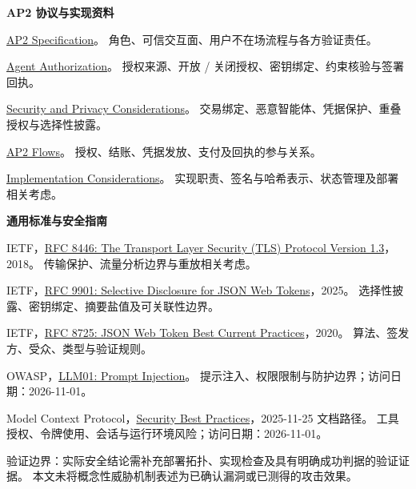 \documentclass[UTF8,fontset=fandol,a4paper,zihao=-4]{ctexart}
\newcommand{\Topic}[2]{\vspace{4pt}{\color{teal}\bfseries #1}\quad #2\par}
\newcommand{\Note}[1]{{\fontsize{9}{13.1}\selectfont\color{muted}#1\par}}
\newcommand{\Link}[2]{\href{#1}{#2}}
\begin{document}
\vspace{7pt}
{\bfseries\color{teal}AP2 协议与实现资料\par}
\begingroup\fontsize{10}{14.4}\selectfont
\Topic{[P1]}{\Link{https://github.com/iXanadu13/AP2/blob/019561ad8138d869da43d18e932f2edc155c48c9/docs/ap2/specification.md}{AP2 Specification}。
角色、可信交互面、用户不在场流程与各方验证责任。}
\Topic{[P2]}{\Link{https://github.com/iXanadu13/AP2/blob/019561ad8138d869da43d18e932f2edc155c48c9/docs/ap2/agent_authorization.md}{Agent Authorization}。
授权来源、开放 / 关闭授权、密钥绑定、约束核验与签署回执。}
\Topic{[P3]}{\Link{https://github.com/iXanadu13/AP2/blob/019561ad8138d869da43d18e932f2edc155c48c9/docs/ap2/security_and_privacy_considerations.md}{Security and Privacy Considerations}。
交易绑定、恶意智能体、凭据保护、重叠授权与选择性披露。}
\Topic{[P4]}{\Link{https://github.com/iXanadu13/AP2/blob/019561ad8138d869da43d18e932f2edc155c48c9/docs/ap2/flows.md}{AP2 Flows}。
授权、结账、凭据发放、支付及回执的参与关系。}
\Topic{[P5]}{\Link{https://github.com/iXanadu13/AP2/blob/019561ad8138d869da43d18e932f2edc155c48c9/docs/ap2/implementation_considerations.md}{Implementation Considerations}。
实现职责、签名与哈希表示、状态管理及部署相关考虑。}
\endgroup

\vspace{8pt}
{\bfseries\color{teal}通用标准与安全指南\par}
\begingroup\fontsize{10}{14.4}\selectfont
\Topic{[S1]}{IETF，\Link{https://www.rfc-editor.org/rfc/rfc8446.html}{RFC 8446: The Transport Layer Security (TLS) Protocol Version 1.3}，2018。
传输保护、流量分析边界与重放相关考虑。}
\Topic{[S2]}{IETF，\Link{https://www.rfc-editor.org/rfc/rfc9901.html}{RFC 9901: Selective Disclosure for JSON Web Tokens}，2025。
选择性披露、密钥绑定、摘要盐值及可关联性边界。}
\Topic{[S3]}{IETF，\Link{https://www.rfc-editor.org/rfc/rfc8725.html}{RFC 8725: JSON Web Token Best Current Practices}，2020。
算法、签发方、受众、类型与验证规则。}
\Topic{[S4]}{OWASP，\Link{https://genai.owasp.org/llmrisk/llm01-prompt-injection/}{LLM01: Prompt Injection}。
提示注入、权限限制与防护边界；访问日期：2026-11-01。}
\Topic{[S5]}{Model Context Protocol，\Link{https://modelcontextprotocol.io/docs/2025-11-25/tutorials/security/security_best_practices}{Security Best Practices}，2025-11-25 文档路径。
工具授权、令牌使用、会话与运行环境风险；访问日期：2026-11-01。}
\endgroup

\vspace{8pt}
\Note{验证边界：实际安全结论需补充部署拓扑、实现检查及具有明确成功判据的验证证据。
本文未将概念性威胁机制表述为已确认漏洞或已测得的攻击效果。}
\end{document}
